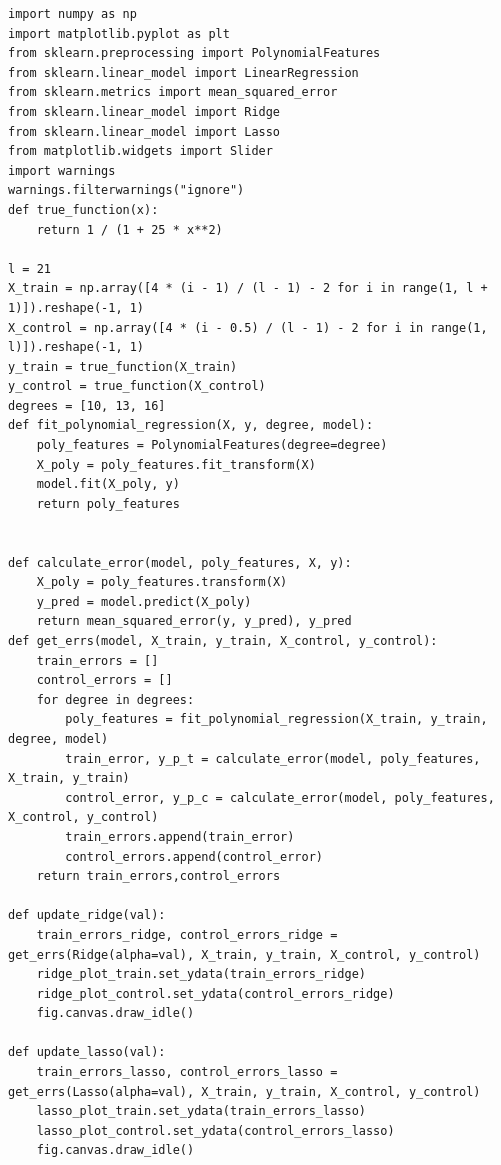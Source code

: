 \documentclass[12pt]{report}
\begin{document}
\begin{lstlisting}[label=lst:gen,caption=код, решающий поставленную задачу]
import numpy as np
import matplotlib.pyplot as plt
from sklearn.preprocessing import PolynomialFeatures
from sklearn.linear_model import LinearRegression
from sklearn.metrics import mean_squared_error
from sklearn.linear_model import Ridge
from sklearn.linear_model import Lasso
from matplotlib.widgets import Slider
import warnings
warnings.filterwarnings("ignore")
def true_function(x):
    return 1 / (1 + 25 * x**2)

l = 21
X_train = np.array([4 * (i - 1) / (l - 1) - 2 for i in range(1, l + 1)]).reshape(-1, 1)
X_control = np.array([4 * (i - 0.5) / (l - 1) - 2 for i in range(1, l)]).reshape(-1, 1)
y_train = true_function(X_train)
y_control = true_function(X_control)
degrees = [10, 13, 16]
def fit_polynomial_regression(X, y, degree, model):
    poly_features = PolynomialFeatures(degree=degree)
    X_poly = poly_features.fit_transform(X)
    model.fit(X_poly, y)
    return poly_features


def calculate_error(model, poly_features, X, y):
    X_poly = poly_features.transform(X)
    y_pred = model.predict(X_poly)
    return mean_squared_error(y, y_pred), y_pred
def get_errs(model, X_train, y_train, X_control, y_control):
    train_errors = []
    control_errors = []
    for degree in degrees:
        poly_features = fit_polynomial_regression(X_train, y_train, degree, model)
        train_error, y_p_t = calculate_error(model, poly_features, X_train, y_train)
        control_error, y_p_c = calculate_error(model, poly_features, X_control, y_control)
        train_errors.append(train_error)
        control_errors.append(control_error)
    return train_errors,control_errors

def update_ridge(val):
    train_errors_ridge, control_errors_ridge = get_errs(Ridge(alpha=val), X_train, y_train, X_control, y_control)
    ridge_plot_train.set_ydata(train_errors_ridge)
    ridge_plot_control.set_ydata(control_errors_ridge)
    fig.canvas.draw_idle()
    
def update_lasso(val):
    train_errors_lasso, control_errors_lasso = get_errs(Lasso(alpha=val), X_train, y_train, X_control, y_control)
    lasso_plot_train.set_ydata(train_errors_lasso)
    lasso_plot_control.set_ydata(control_errors_lasso)
    fig.canvas.draw_idle()


\end{lstlisting}
\end{document}

